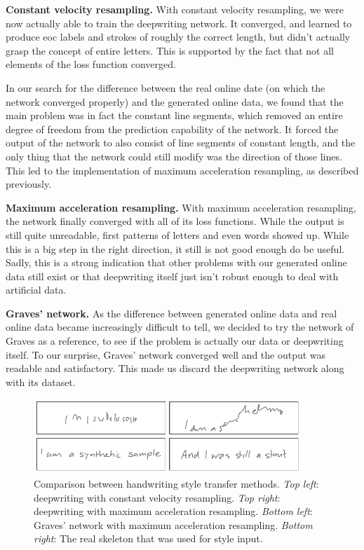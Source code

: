 \textbf{Constant velocity resampling.} 
With constant velocity resampling, we were now actually able to train the \gls{deepwriting} network. It converged, and learned to produce \gls{eoc} labels and strokes of roughly the correct length, but didn't actually grasp the concept of entire letters. This is supported by the fact that not all elements of the loss function converged.

In our search for the difference between the real online date (on which the network converged properly) and the generated online data, we found that the main problem was in fact the constant line segments, which removed an entire degree of freedom from the prediction capability of the network. It forced the output of the network to also consist of line segments of constant length, and the only thing that the network could still modify was the direction of those lines.
This led to the implementation of maximum acceleration resampling, as described previously.

\textbf{Maximum acceleration resampling.}
With maximum acceleration resampling, the network finally converged with all of its loss functions. While the output is still quite unreadable, first patterns of letters and even words showed up. While this is a big step in the right direction, it still is not good enough do be useful. Sadly, this is a strong indication that other problems with our generated online data still exist or that \gls{deepwriting} itself just isn't robust enough to deal with artificial data.

\textbf{Graves' network.}
As the difference between generated online data and real online data became increasingly difficult to tell, we decided to try the network of Graves as a reference, to see if the problem is actually our data or \gls{deepwriting} itself. To our surprise, Graves' network converged well and the output was readable and satisfactory. This made us discard the \gls{deepwriting} network along with its dataset.


\begin{figure}
  \centering
  \includegraphics[width=0.90\textwidth]{../assets/style_transfer/comparison.pdf}
  \caption[Comparison between handwriting style transfer methods]{Comparison between handwriting style transfer methods. \emph{Top left}: \gls{deepwriting} with constant velocity resampling. \emph{Top right}: \gls{deepwriting} with maximum acceleration resampling. \emph{Bottom left}: Graves' network with maximum acceleration resampling. \emph{Bottom right}: The real skeleton that was used for style input.}
  \label{fig:handwritingStyleTransferComparison}
\end{figure}

